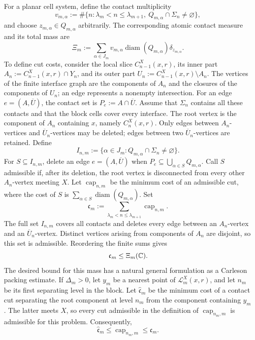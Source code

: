 For a planar cell system, define the contact multiplicity
\[
 v_{m,\alpha}:=
 \#\{n:\lambda_m<n\le\lambda_{m+1},\
                 Q_{m,\alpha}\cap\Sigma_n\ne\varnothing\},
\]
and choose \(z_{m,\alpha}\in Q_{m,\alpha}\) arbitrarily. The
corresponding atomic contact measure and its total mass are
\[
 \Xi_m:=
 \sum_{\alpha\in J_m}
 v_{m,\alpha}\operatorname{diam}(Q_{m,\alpha})\delta_{z_{m,\alpha}}.
\]
To define cut costs, consider the local slice \(C_{n-1}^X(x,r)\), its
inner part \(A_n:=C_{n-1}^X(x,r)\cap Y_n\), and its outer part
\(U_n:=C_{n-1}^X(x,r)\setminus A_n\). The vertices of the finite
interface graph are the components of \(A_n\) and the closures of the
components of \(U_n\); an edge represents a nonempty intersection. For
an edge \(e=(A,\overline U)\), the contact set is
\(P_e:=A\cap\overline U\). Assume that \(\Sigma_n\) contains all these
contacts and that the block cells cover every interface. The root
vertex is the component of \(A_n\) containing \(x\), namely
\(C_n^X(x,r)\). Only edges between \(A_n\)-vertices and
\(\overline U_n\)-vertices may be deleted; edges between two
\(\overline U_n\)-vertices are retained. Define
\[
I_{n,m}:=\{\alpha\in J_m:Q_{m,\alpha}\cap\Sigma_n\ne\varnothing\}.
\]
For \(S\subseteq I_{n,m}\), delete an edge \(e=(A,\overline U)\) when
\(P_e\subseteq\bigcup_{\alpha\in S}Q_{m,\alpha}\). Call \(S\)
admissible if, after its deletion, the root vertex is disconnected from
every other \(A_n\)-vertex meeting \(X\). Let
\(\operatorname{cap}_{n,m}\) be the minimum cost of an admissible cut,
where the cost of \(S\) is
\(\sum_{\alpha\in S}\operatorname{diam}(Q_{m,\alpha})\). Set
\[
\mathfrak c_m:=
\sum_{\lambda_m<n\le\lambda_{m+1}}\operatorname{cap}_{n,m}.
\]
The full set \(I_{n,m}\) covers all contacts and deletes every edge
between an \(A_n\)-vertex and an \(\overline U_n\)-vertex. Distinct
vertices arising from components of \(A_n\) are disjoint, so this set
is admissible. Reordering the finite sums gives
\begin{equation}
 \mathfrak c_m\le\Xi_m(\mathbb C).
 \label{eq:block-capacity-contact-mass}
\end{equation}
The desired bound for this mass has a natural general formulation as a
Carleson packing estimate. If \(\Delta_m>0\), let \(y_m\) be a nearest
point of \(\mathcal L_m^X(x,r)\), and let \(n_m\) be its first
separating level in the block. Let \(\widehat{\mathfrak c}_m\) be the
minimum cost of a contact cut separating the root component at level
\(n_m\) from the component containing \(y_m\). The latter meets \(X\),
so every cut admissible in the definition of
\(\operatorname{cap}_{n_m,m}\) is admissible for this problem.
Consequently,
\begin{equation}
 \widehat{\mathfrak c}_m
 \le\operatorname{cap}_{n_m,m}
 \le\mathfrak c_m.
 \label{eq:target-cut-block-bound}
\end{equation}

